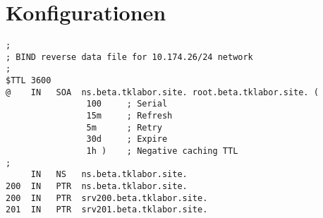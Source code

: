 \section{Konfigurationen}
\begin{scriptsize}\label{cfg:bind-reverse-lookup}
\begin{lstlisting}
;
; BIND reverse data file for 10.174.26/24 network
;
$TTL 3600
@    IN   SOA  ns.beta.tklabor.site. root.beta.tklabor.site. (
                100     ; Serial
                15m     ; Refresh
                5m      ; Retry
                30d     ; Expire
                1h )    ; Negative caching TTL
;
     IN   NS   ns.beta.tklabor.site.
200  IN   PTR  ns.beta.tklabor.site.
200  IN   PTR  srv200.beta.tklabor.site.
201  IN   PTR  srv201.beta.tklabor.site.
\end{lstlisting}
\end{scriptsize}
